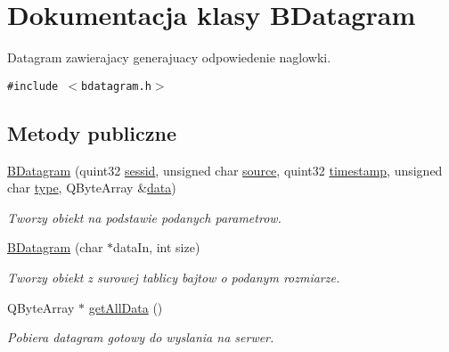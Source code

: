 \hypertarget{class_b_datagram}{
\section{Dokumentacja klasy BDatagram}
\label{class_b_datagram}
}
Datagram zawierajacy generajuacy odpowiedenie naglowki.  


{\tt \#include $<$bdatagram.h$>$}

\subsection*{Metody publiczne}
\begin{CompactItemize}
\item 
\hyperlink{class_b_datagram_6a687551e97a36b91c6a40a1c5a374ed}{BDatagram} (quint32 \hyperlink{class_b_datagram_d77fa0aefd216480abe999e24f28dba6}{sessid}, unsigned char \hyperlink{class_b_datagram_2e70a774059cddc0a5715850370bc1d9}{source}, quint32 \hyperlink{class_b_datagram_1a0d1b7430e0e9d95cd9248b3499904f}{timestamp}, unsigned char \hyperlink{class_b_datagram_3ae0b66921f9b51864beb65e5e03eeb9}{type}, QByteArray \&\hyperlink{class_b_datagram_98d72aa468643e0179bbc02d6dbf388e}{data})
\begin{CompactList}\small\item\em Tworzy obiekt na podstawie podanych parametrow. \item\end{CompactList}\item 
\hypertarget{class_b_datagram_63ed2c2ac245dec6a1179a3ac7ace1b6}{
\hyperlink{class_b_datagram_63ed2c2ac245dec6a1179a3ac7ace1b6}{BDatagram} (char $\ast$dataIn, int size)}
\label{class_b_datagram_63ed2c2ac245dec6a1179a3ac7ace1b6}

\begin{CompactList}\small\item\em Tworzy obiekt z surowej tablicy bajtow o podanym rozmiarze. \item\end{CompactList}\item 
\hypertarget{class_b_datagram_bf97808c5ae33d46feb4e2f1a920cb4f}{
QByteArray $\ast$ \hyperlink{class_b_datagram_bf97808c5ae33d46feb4e2f1a920cb4f}{getAllData} ()}
\label{class_b_datagram_bf97808c5ae33d46feb4e2f1a920cb4f}

\begin{CompactList}\small\item\em Pobiera datagram gotowy do wyslania na serwer. \item\end{CompactList}\end{CompactItemize}
